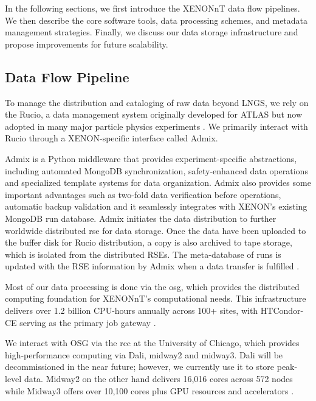 In the following sections, we first introduce the XENONnT data flow pipelines. We then describe the core software tools, data processing schemes, and metadata management strategies. Finally, we discuss our data storage infrastructure and propose improvements for future scalability.

\subsection{Data Flow Pipeline}



To manage the distribution and cataloging of raw data beyond LNGS, we rely on the Rucio, a data management system originally developed for ATLAS but now adopted in many major particle physics experiments \cite{Barisits_2019}. We primarily interact with Rucio through a XENON-specific interface called Admix. 

Admix is a Python middleware that provides experiment-specific abstractions, including automated MongoDB synchronization, safety-enhanced data operations and specialized template systems for data organization. Admix also provides some important advantages such as two-fold data verification before operations, automatic backup validation and it seamlessly integrates with XENON's existing MongoDB run database. Admix initiates the data distribution to further worldwide distributed \acrfull{rse} for data storage. Once the data have been uploaded to the buffer disk for Rucio distribution, a copy is also archived to tape storage, which is isolated from the distributed RSEs. The meta-database of runs is updated with the RSE information by Admix when a data transfer is fulfilled \cite{Ahlin_2019}.


Most of our data processing is done via the \acrfull{osg}, which provides the distributed computing foundation for XENONnT's computational needs. This infrastructure delivers over 1.2 billion CPU-hours annually across 100+ sites, with HTCondor-CE serving as the primary job gateway \cite{osg_htc}. 

We interact with OSG via the \acrfull{rcc} at the University of Chicago, which provides high-performance computing via Dali, midway2 and midway3. Dali will be decommissioned in the near future; however, we currently use it to store peak-level data. Midway2 on the other hand delivers 16,016 cores across 572 nodes \cite{uchicago_rcc_hpc} while Midway3 offers over 10,100 cores plus GPU resources and accelerators \cite{uchicago_midway3}.

